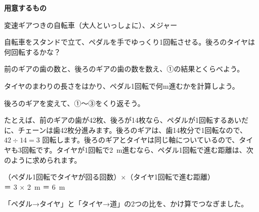 \clearpage
\begin{yattemiyou}
\par\addvspace{3pt}\textbf{用意するもの}\par\noindent 変速ギアつきの自転車（大人といっしょに）、メジャー
\begin{enumerate}[label={\bkcircled[bkGreen]{\arabic*}}, leftmargin=2.4\zw, itemsep=1pt, topsep=3pt]
\item 自転車をスタンドで立て、ペダルを手でゆっくり1回転させる。後ろのタイヤは何回転するかな？
\item 前のギアの歯の数と、後ろのギアの歯の数を数え、①の結果とくらべよう。
\item タイヤのまわりの長さをはかり、ペダル1回転で何m進むかを計算しよう。
\item 後ろのギアを変えて、①〜③をくり返そう。
\end{enumerate}
\end{yattemiyou}

\noindent たとえば、前のギアの歯が42枚、後ろが14枚なら、ペダルが1回転するあいだに、チェーンは歯42枚分進みます。後ろのギアは、歯14枚分で1回転なので、$42\div14=3$ 回転します。後ろのギアとタイヤは同じ軸についているので、タイヤも3回転です。タイヤが1回転で\qty{2}{m}進むなら、ペダル1回転で進む距離は、次のように求められます。

\begin{center}
（ペダル1回転でタイヤが回る回数）×（タイヤ1回転で進む距離）\\
＝ 3 × \qty{2}{m} ＝ \qty{6}{m}
\end{center}

「ペダル→タイヤ」と「タイヤ→道」の2つの比を、かけ算でつなぎました。

\begin{omoidasou}
\end{omoidasou}


